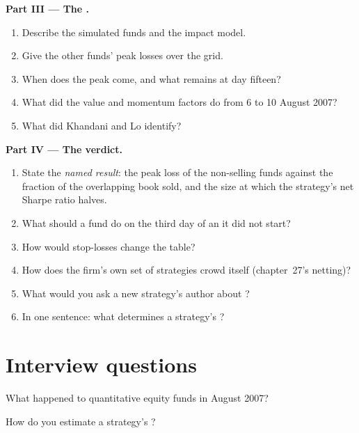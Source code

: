 \begin{problem}
\medskip\noindent\textbf{Part III --- The .}
\begin{enumerate}[resume]
\item Describe the simulated funds and the impact model.
\item Give the other funds' peak losses over the grid.
\item When does the peak come, and what remains at day fifteen?
\item What did the value and momentum factors do from 6 to 10 August 2007?
\item What did Khandani and Lo identify?
\end{enumerate}

\medskip\noindent\textbf{Part IV --- The verdict.}
\begin{enumerate}[resume]
\item State the \emph{named result}: the peak loss of the non-selling funds against the fraction of the overlapping book sold, and the size at which the strategy's
net Sharpe ratio halves.
\item What should a fund do on the third day of an  it did not start?
\item How would stop-losses change the table?
\item How does the firm's own set of strategies crowd itself (chapter~27's netting)?
\item What would you ask a new strategy's author about ?
\item In one sentence: what determines a strategy's ?
\end{enumerate}
\end{problem}

\section{Interview questions}

\begin{interviewq}\label{iq:rs:capacity-decay-and-crowding:1}
What happened to quantitative equity funds in August 2007?
\end{interviewq}

\begin{interviewq}\label{iq:rs:capacity-decay-and-crowding:2}
How do you estimate a strategy's ?
\end{interviewq}

